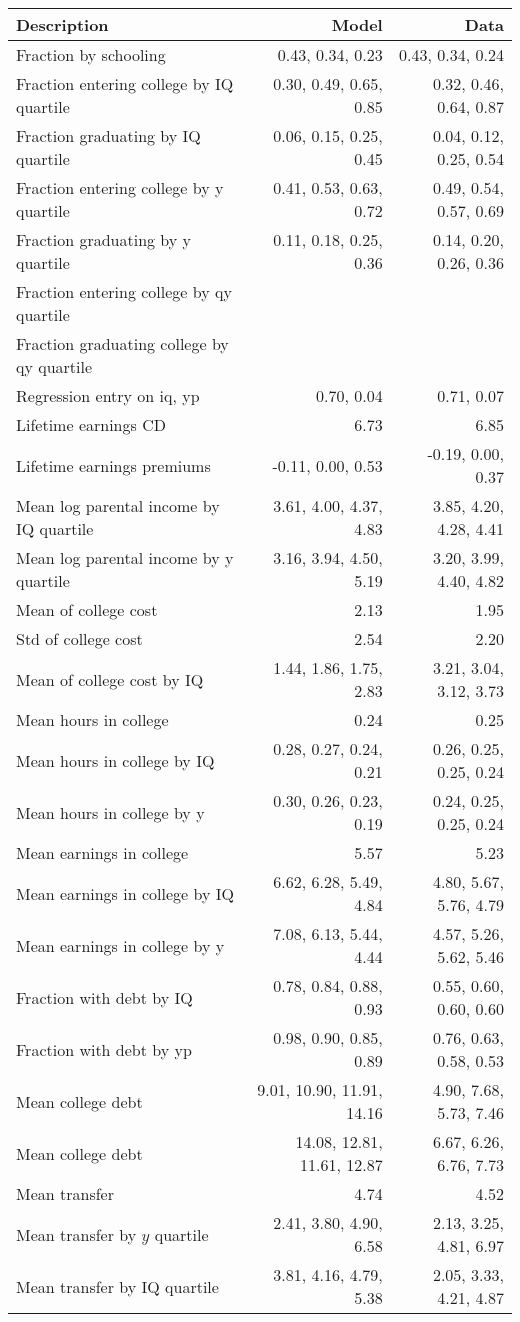 \begin{tabular}{lrr}
\hline
Description & Model  & Data  \\ 
\hline
Fraction by schooling & 0.43, 0.34, 0.23  & 0.43, 0.34, 0.24  \\ 
Fraction entering college by IQ quartile & 0.30, 0.49, 0.65, 0.85  & 0.32, 0.46, 0.64, 0.87  \\ 
Fraction graduating by IQ quartile & 0.06, 0.15, 0.25, 0.45  & 0.04, 0.12, 0.25, 0.54  \\ 
Fraction entering college by y quartile & 0.41, 0.53, 0.63, 0.72  & 0.49, 0.54, 0.57, 0.69  \\ 
Fraction graduating by y quartile & 0.11, 0.18, 0.25, 0.36  & 0.14, 0.20, 0.26, 0.36  \\ 
Fraction entering college by qy quartile &   &   \\ 
Fraction graduating college by qy quartile &   &   \\ 
Regression entry on iq, yp & 0.70, 0.04  & 0.71, 0.07  \\ 
Lifetime earnings CD & 6.73  & 6.85  \\ 
Lifetime earnings premiums & -0.11, 0.00, 0.53  & -0.19, 0.00, 0.37  \\ 
Mean log parental income by IQ quartile & 3.61, 4.00, 4.37, 4.83  & 3.85, 4.20, 4.28, 4.41  \\ 
Mean log parental income by y quartile & 3.16, 3.94, 4.50, 5.19  & 3.20, 3.99, 4.40, 4.82  \\ 
Mean of college cost & 2.13  & 1.95  \\ 
Std of college cost & 2.54  & 2.20  \\ 
Mean of college cost by IQ & 1.44, 1.86, 1.75, 2.83  & 3.21, 3.04, 3.12, 3.73  \\ 
Mean hours in college & 0.24  & 0.25  \\ 
Mean hours in college by IQ & 0.28, 0.27, 0.24, 0.21  & 0.26, 0.25, 0.25, 0.24  \\ 
Mean hours in college by y & 0.30, 0.26, 0.23, 0.19  & 0.24, 0.25, 0.25, 0.24  \\ 
Mean earnings in college & 5.57  & 5.23  \\ 
Mean earnings in college by IQ & 6.62, 6.28, 5.49, 4.84  & 4.80, 5.67, 5.76, 4.79  \\ 
Mean earnings in college by y & 7.08, 6.13, 5.44, 4.44  & 4.57, 5.26, 5.62, 5.46  \\ 
Fraction with debt by IQ & 0.78, 0.84, 0.88, 0.93  & 0.55, 0.60, 0.60, 0.60  \\ 
Fraction with debt by yp & 0.98, 0.90, 0.85, 0.89  & 0.76, 0.63, 0.58, 0.53  \\ 
Mean college debt & 9.01, 10.90, 11.91, 14.16  & 4.90, 7.68, 5.73, 7.46  \\ 
Mean college debt & 14.08, 12.81, 11.61, 12.87  & 6.67, 6.26, 6.76, 7.73  \\ 
Mean transfer & 4.74  & 4.52  \\ 
Mean transfer by $y$ quartile & 2.41, 3.80, 4.90, 6.58  & 2.13, 3.25, 4.81, 6.97  \\ 
Mean transfer by IQ quartile & 3.81, 4.16, 4.79, 5.38  & 2.05, 3.33, 4.21, 4.87  \\ 
\hline
\end{tabular}%
